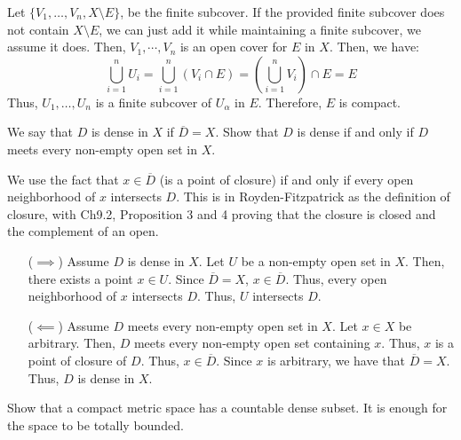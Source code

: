 \documentclass[12pt]{article}
\begin{document}
\begin{solu}
\begin{enumerate}
        Let $\{V_{1}, \ldots, V_{n}, X \setminus E\}$, be the finite subcover. If the provided finite subcover does not contain $X \setminus E$, we can just add it while maintaining a finite subcover, we assume it does. Then, $V_1, \cdots, V_n$ is an open cover for $E$ in $X$. Then, we have:
        \[ \bigcup_{i=1}^n U_i = \bigcup_{i=1}^n (V_i \cap E) = \left(\bigcup_{i=1}^n V_i\right) \cap E = E \]
        Thus, $U_1, \ldots, U_n$ is a finite subcover of $U_\alpha$ in $E$. Therefore, $E$ is compact.
    \end{enumerate}
\end{solu}

\newpage

\begin{problab}{3}
    We say that $D$ is dense in $X$ if $\overline{D} = X$. Show that $D$ is dense if and only if $D$ meets every non-empty open set in $X$. 
\end{problab}

\begin{solu}
    We use the fact that $x \in \overline{D}$ (is a point of closure) if and only if every open neighborhood of $x$ intersects $D$. This is in Royden-Fitzpatrick as the definition of closure, with Ch9.2, Proposition 3 and 4 proving that the closure is closed and the complement of an open.
    \begin{itemize}
        \item[($\implies$)] Assume $D$ is dense in $X$. Let $U$ be a non-empty open set in $X$. Then, there exists a point $x \in U$. Since $\overline{D} = X$, $x \in \overline{D}$. Thus, every open neighborhood of $x$ intersects $D$. Thus, $U$ intersects $D$.
        \item[($\impliedby$)] Assume $D$ meets every non-empty open set in $X$. Let $x \in X$ be arbitrary. Then, $D$ meets every non-empty open set containing $x$. Thus, $x$ is a point of closure of $D$. Thus, $x \in \overline{D}$. Since $x$ is arbitrary, we have that $\overline{D} = X$. Thus, $D$ is dense in $X$.
    \end{itemize}
\end{solu}
\newpage


\begin{problab}{4}
    Show that a compact metric space has a countable dense subset. It is enough for the space to be totally bounded.
\end{problab}
\end{document}
